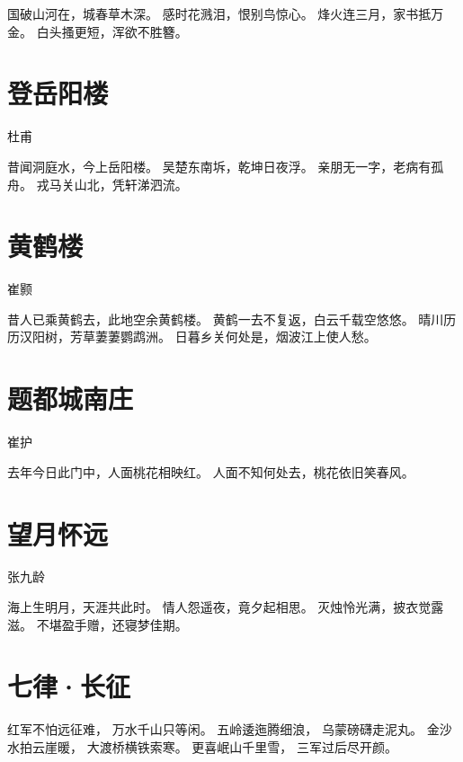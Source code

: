 \documentclass[12pt,UTF8]{ctexbook}
\begin{document}
国破山河在，城春草木深。
感时花溅泪，恨别鸟惊心。
烽火连三月，家书抵万金。
白头搔更短，浑欲不胜簪。


\section{登岳阳楼}

杜甫

昔闻洞庭水，今上岳阳楼。
吴楚东南坼，乾坤日夜浮。
亲朋无一字，老病有孤舟。
戎马关山北，凭轩涕泗流。

\section{黄鹤楼}

崔颢

昔人已乘黄鹤去，此地空余黄鹤楼。
黄鹤一去不复返，白云千载空悠悠。
晴川历历汉阳树，芳草萋萋鹦鹉洲。
日暮乡关何处是，烟波江上使人愁。

\section{题都城南庄}

崔护

去年今日此门中，人面桃花相映红。
人面不知何处去，桃花依旧笑春风。

\section{望月怀远}

张九龄

海上生明月，天涯共此时。
情人怨遥夜，竟夕起相思。
灭烛怜光满，披衣觉露滋。
不堪盈手赠，还寝梦佳期。

\section{七律·长征}

红军不怕远征难，
万水千山只等闲。
五岭逶迤腾细浪，
乌蒙磅礴走泥丸。
金沙水拍云崖暖，
大渡桥横铁索寒。
更喜岷山千里雪，
三军过后尽开颜。
\end{document}
